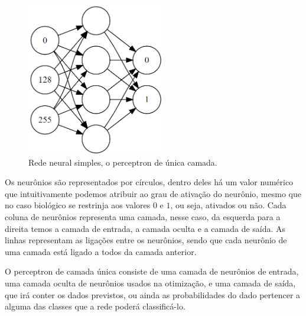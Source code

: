 \documentclass[12pt,brazil]{article}
\begin{document}
\begin{figure}[htb]
\centering
\includegraphics[width=6cm]{figuras/perceptron}
\caption{\label{fig:perceptron}Rede neural simples, o perceptron de única camada. }
\end{figure}

Os neurônios são representados por círculos, dentro deles há um valor numérico que intuitivamente podemos atribuir ao grau de ativação do neurônio, mesmo que no caso biológico se restrinja aos valores $0$ e $1$, ou seja, ativados ou não. Cada coluna de neurônios representa uma camada, nesse caso, da esquerda para a direita temos a camada de entrada, a camada oculta e a camada de saída. As linhas representam as ligações entre os neurônios, sendo que cada neurônio de uma camada está ligado a todos da camada anterior.

O perceptron de camada única consiste de uma camada de neurônios de entrada, uma camada oculta de neurônios usados na otimização, e uma camada de saída, que irá conter os dados previstos, ou ainda as probabilidades do dado pertencer a alguma das classes que a rede poderá classificá-lo.



\printbibliography[title=Referências]
\end{document}
